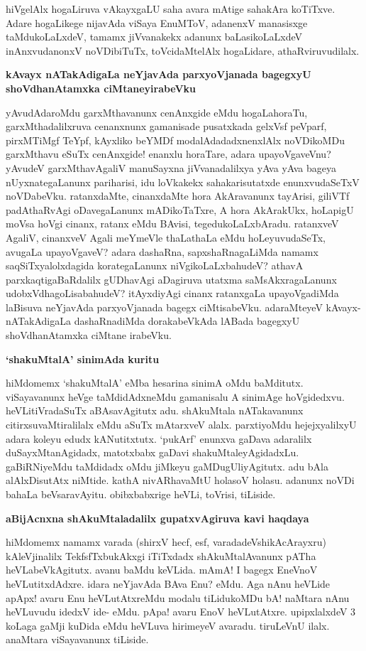 \noindent
hiVgelAlx hogaLiruva vAkayxgaLU saha avara mAtige sahakAra koTiTxve. Adare hogaLikege nijavAda viSaya EnuMToV, adanenxV manasisxge taMdukoLaLxdeV, tamamx jiVvanakekx adanunx baLasikoLaLxdeV inAnxvudanonxV noVDibiTuTx, toVcidaMtelAlx hogaLidare, athaRviruvudilalx.

{\bigskip
\noindent
{\large\bf kAvayx nATakAdigaLa neYjavAda parxyoVjanada bagegxyU shoVdhanAtamxka ciMtaneyirabeVku}}\label{page233}
\medskip

\noindent
yAvudAdaroMdu garxMthavanunx cenAnxgide eMdu hogaLahoraTu, garxMthadalilxruva cenanxnunx gamanisade pusatxkada gelxVsf peVparf, pirxMTiMgf TeYpf, kAyxliko beYMDf modalAdadadxnenxlAlx noVDikoMDu garxMthavu eSuTx cenAnxgide! enanxlu horaTare, adara upayoVgaveVnu? yAvudeV garxMthavAgaliV manuSayxna jiVvanadalilxya yAva yAva bageya nUyxnategaLanunx pariharisi, idu loVkakekx sahakarisutatxde enunxvudaSeTxV noVDabeVku. ratanxdaMte, cinanxdaMte hora AkAravanunx tayArisi, giliVTf padAthaRvAgi oDavegaLanunx mADikoTaTxre, A hora AkArakUkx, hoLapigU moVsa hoVgi cinanx, ratanx eMdu BAvisi, tegedukoLaLxbAradu. ratanxveV AgaliV, cinanxveV Agali meYmeVle thaLathaLa eMdu hoLeyuvudaSeTx, avugaLa upayoVgaveV? adara dashaRna, sapxshaRnagaLiMda namamx saqSiTxyalolxdagida korategaLanunx niVgikoLaLxbahudeV? athavA parxkaqtigaBaRdalilx gUDhavAgi aDagiruva utatxma saMsAkxragaLanunx udobxVdhagoLisabahudeV? itAyxdiyAgi cinanx ratanxgaLa upayoVgadiMda laBisuva neYjavAda parxyoVjanada bagegx ciMtisabeVku. adaraMteyeV kAvayx-nATakAdigaLa dashaRnadiMda dorakabeVkAda lABada bagegxyU shoVdhanAtamxka ciMtane irabeVku.

{\bigskip
\noindent
{\large\bf `shakuMtalA' sinimAda kuritu}}\label{page234}
\medskip

\noindent
hiMdomemx `shakuMtalA' eMba hesarina sinimA oMdu baMditutx. viSayavanunx heVge taMdidAdxneMdu gamanisalu A sinimAge hoVgidedxvu. heVLitiVradaSuTx aBAsavAgitutx adu. shAkuMtala nATakavanunx citirxsuvaMtiralilalx eMdu aSuTx mAtarxveV alalx. parxtiyoMdu hejejxyalilxyU adara koleyu edudx kANutitxtutx. `pukArf' enunxva gaDava adaralilx duSayxMtanAgidadx, matotxbabx gaDavi shakuMtaleyAgidadxLu. gaBiRNiyeMdu taMdidadx oMdu jiMkeyu gaMDugUliyAgitutx. adu bAla alAlxDisutAtx niMtide. kathA nivARhavaMtU holasoV holasu. adanunx noVDi bahaLa beVsaravAyitu. obibxbabxrige heVLi, toVrisi, tiLiside.

{\bigskip
\noindent
{\large\bf aBijAcnxna shAkuMtaladalilx gupatxvAgiruva kavi haqdaya}}\label{page234a}
\medskip

\noindent
hiMdomemx namamx varada (shirxV hecf, esf, varadadeVshikAcArayxru) kAleVjinalilx TekfsfTxbukAkxgi iTiTxdadx shAkuMtalAvanunx pATha heVLabeVkAgitutx. avanu baMdu keVLida. mAmA! I bagegx EneVnoV heVLutitxdAdxre. idara neYjavAda BAva Enu? eMdu. Aga nAnu heVLide apApx! avaru Enu heVLutAtxreMdu modalu tiLidukoMDu bA! naMtara nAnu heVLuvudu idedxV ide- eMdu. pApa! avaru EnoV heVLutAtxre. upipxlalxdeV 3 koLaga gaMji kuDida eMdu heVLuva hirimeyeV avaradu. tiruLeVnU ilalx. anaMtara viSayavanunx tiLiside. 

